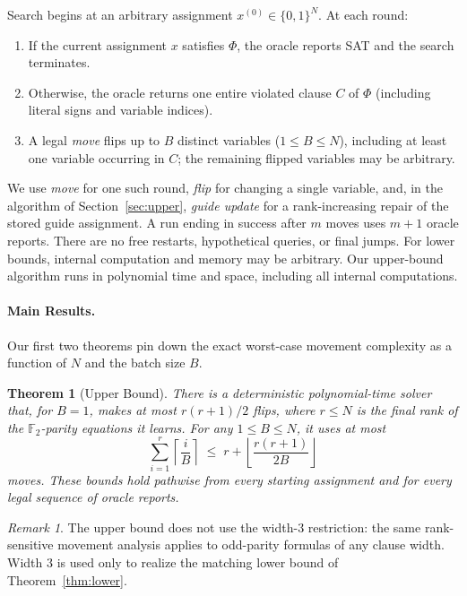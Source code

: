 \documentclass[11pt,a4paper]{article}
\newtheorem{theorem}{Theorem}[section]
\theoremstyle{definition}
\theoremstyle{remark}
\newtheorem*{plainremark}{Remark}
\newcommand{\F}{\mathbb{F}}
\begin{document}
Search begins at an arbitrary assignment $x^{(0)} \in \{0,1\}^N$. At each round:
\begin{enumerate}
    \item If the current assignment $x$ satisfies $\Phi$, the oracle reports \textsc{SAT} and the search terminates.
    \item Otherwise, the oracle returns one entire violated clause $C$ of $\Phi$ (including literal signs and variable indices).
    \item A legal \emph{move} flips up to $B$ distinct variables ($1 \le B \le N$), including at least one variable occurring in $C$; the remaining flipped variables may be arbitrary.
\end{enumerate}
We use \emph{move} for one such round, \emph{flip} for changing a single variable, and, in the algorithm of Section~\ref{sec:upper}, \emph{guide update} for a rank-increasing repair of the stored guide assignment. A run ending in success after $m$ moves uses $m+1$ oracle reports. There are no free restarts, hypothetical queries, or final jumps. For lower bounds, internal computation and memory may be arbitrary. Our upper-bound algorithm runs in polynomial time and space, including all internal computations.

\paragraph{Main Results.}
Our first two theorems pin down the exact worst-case movement complexity as a function of $N$ and the batch size $B$.

\begin{theorem}[Upper Bound]\label{thm:upper}
There is a deterministic polynomial-time solver that, for $B = 1$, makes at most $r(r+1)/2$ flips, where $r \le N$ is the final rank of the $\F_2$-parity equations it learns. For any $1 \le B \le N$, it uses at most
\[
    \sum_{i=1}^r \left\lceil\frac{i}{B}\right\rceil \;\le\; r + \left\lfloor\frac{r(r+1)}{2B}\right\rfloor
\]
moves. These bounds hold pathwise from every starting assignment and for every legal sequence of oracle reports.
\end{theorem}

\begin{plainremark}
The upper bound does not use the width-$3$ restriction: the same rank-sensitive movement analysis applies to odd-parity formulas of any clause width. Width $3$ is used only to realize the matching lower bound of Theorem~\ref{thm:lower}.
\end{plainremark}
\end{document}
